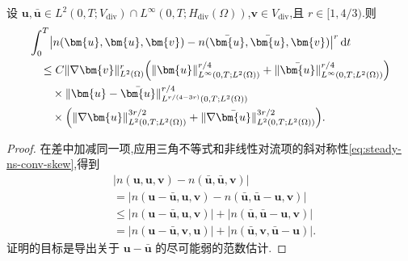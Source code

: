 \begin{lemma}[非线性对流项差的估计]\label{lem:time-dependent-convection-difference}
设 $\bm{u},\bar{\bm{u}}\in L^2(0,T;V_{\mathrm{div}})\cap L^\infty(0,T;H_{\mathrm{div}}(\Omega))$,$\bm{v}\in V_{\mathrm{div}}$,且 $r\in[1,4/3)$.则
\begin{equation}\label{eq:time-dependent-convection-difference-estimate}
\begin{aligned}
  &\int_0^T
    \bigl|n(\bm{u},\bm{u},\bm{v})
       -n(\bar{\bm{u}},\bar{\bm{u}},\bm{v})\bigr|^r\,\mathrm{d}t\\
  &\quad\leq C\lVert\nabla\bm{v}\rVert_{L^2(\Omega)}^r
    \Bigl(\lVert\bm{u}\rVert_{L^\infty(0,T;L^2(\Omega))}^{r/4}
       +\lVert\bar{\bm{u}}\rVert_{L^\infty(0,T;L^2(\Omega))}^{r/4}\Bigr)\\
  &\qquad\times
    \lVert\bm{u}-\bar{\bm{u}}\rVert
       _{L^{r/(4-3r)}(0,T;L^2(\Omega))}^{r/4}\\
  &\qquad\times\Bigl(
       \lVert\nabla\bm{u}\rVert_{L^2(0,T;L^2(\Omega))}^{3r/2}
       +\lVert\nabla\bar{\bm{u}}\rVert_{L^2(0,T;L^2(\Omega))}^{3r/2}
       \Bigr).
\end{aligned}
\end{equation}
\begin{proof}
在差中加减同一项,应用三角不等式和非线性对流项的斜对称性\cref{eq:steady-ns-conv-skew},得到
\[
\begin{aligned}
  &\bigl|n(\bm{u},\bm{u},\bm{v})
      -n(\bar{\bm{u}},\bar{\bm{u}},\bm{v})\bigr|\\
  &=\bigl|n(\bm{u}-\bar{\bm{u}},\bm{u},\bm{v})
      -n(\bar{\bm{u}},\bar{\bm{u}}-\bm{u},\bm{v})\bigr|\\
  &\leq\bigl|n(\bm{u}-\bar{\bm{u}},\bm{u},\bm{v})\bigr|
      +\bigl|n(\bar{\bm{u}},\bar{\bm{u}}-\bm{u},\bm{v})\bigr|\\
  &=\bigl|n(\bm{u}-\bar{\bm{u}},\bm{v},\bm{u})\bigr|
      +\bigl|n(\bar{\bm{u}},\bm{v},\bar{\bm{u}}-\bm{u})\bigr|.
\end{aligned}
\]
证明的目标是导出关于 $\bm{u}-\bar{\bm{u}}$ 的尽可能弱的范数估计.


\end{proof}
\end{lemma}
